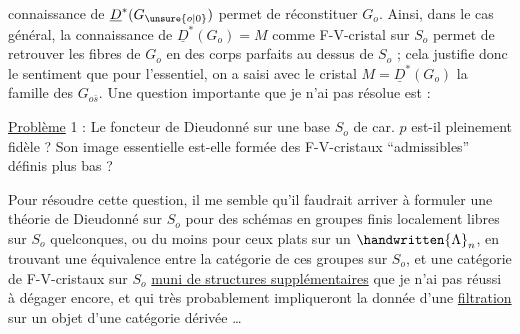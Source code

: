 connaissance de $\underline{D}^{*}(G_{\unsure{o|0}})$ permet de réconstituer $G_o$. Ainsi, dans le cas général, la connaissance de $\underline{D}^{*}(G_o)=M$ comme F-V-cristal sur $S_o$ permet de retrouver les fibres de $G_o$ en des corps parfaits au dessus de $S_o$ ; cela justifie donc le sentiment que pour l'essentiel, on a saisi avec le cristal $M=\underline{D}^{*}(G_o)$ la famille des $G_{o\bar{s}}$. Une question importante  que je n'ai pas résolue est :

\uline{Problème} 1 : Le foncteur de Dieudonné sur une base $S_o$ de car. $p$ est-il pleinement fidèle ?  Son image essentielle est-elle formée des F-V-cristaux ``admissibles'' définis plus bas ?

Pour résoudre cette question, il me semble qu'il faudrait arriver à formuler une théorie de Dieudonné sur  $S_o$ pour des schémas en groupes finis localement libres sur $S_o$ quelconques, ou du moins pour ceux plats sur un $\handwritten{\Lambda}_n$, en trouvant une équivalence entre  la catégorie de ces groupes sur $S_o$, et une catégorie de F-V-cristaux sur $S_o$ \uline{muni de structures supplémentaires} que je n'ai pas réussi à dégager encore, et qui très probablement impliqueront la donnée d'une \uline{filtration} sur un objet  d'une catégorie dérivée \ldots
